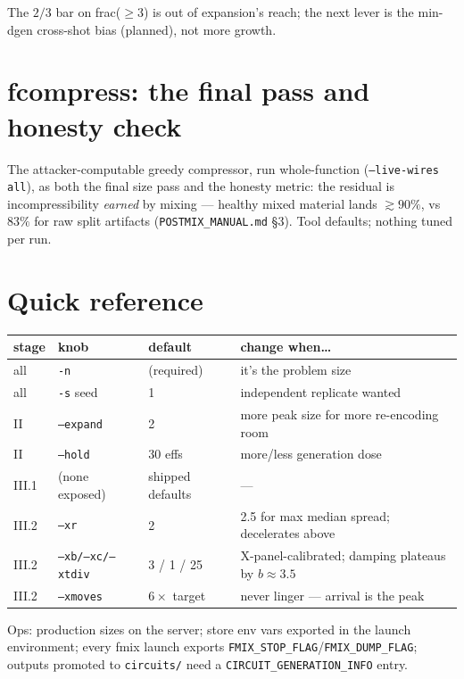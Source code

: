 \documentclass[11pt]{article}
\newcommand{\doc}[1]{\texttt{#1}}
\begin{document}
The $2/3$ bar on frac($\ge$3) is out of expansion's reach; the next lever
is the min-dgen cross-shot bias (planned), not more growth.

\section{fcompress: the final pass and honesty check}

The attacker-computable greedy compressor, run whole-function
(\texttt{--live-wires all}), as both the final size pass and the honesty
metric: the residual is incompressibility \emph{earned} by mixing ---
healthy mixed material lands $\gtrsim 90\%$, vs $83\%$ for raw split
artifacts (\doc{POSTMIX\_MANUAL.md} \S3). Tool defaults; nothing tuned
per run.

\section{Quick reference}

\begin{table}[H]\small
\begin{tabular}{llL{2.6cm}L{6.6cm}}
\toprule
stage & knob & default & change when\ldots \\
\midrule
all & \texttt{-n} & (required) & it's the problem size \\
all & \texttt{-s} seed & 1 & independent replicate wanted \\
II & \texttt{--expand} & 2 & more peak size for more re-encoding room \\
II & \texttt{--hold} & 30 effs & more/less generation dose \\
III.1 & (none exposed) & shipped defaults & --- \\
III.2 & \texttt{--xr} & 2 & 2.5 for max median spread; decelerates above \\
III.2 & \texttt{--xb/--xc/--xtdiv} & 3 / 1 / 25 & X-panel-calibrated; damping plateaus by $b\approx3.5$ \\
III.2 & \texttt{--xmoves} & $6\times$ target & never linger --- arrival is the peak \\
\bottomrule
\end{tabular}
\end{table}

Ops: production sizes on the server; store env vars exported in the launch
environment; every fmix launch exports
\texttt{FMIX\_STOP\_FLAG}/\texttt{FMIX\_DUMP\_FLAG}; outputs promoted to
\doc{circuits/} need a \doc{CIRCUIT\_GENERATION\_INFO} entry.
\end{document}
